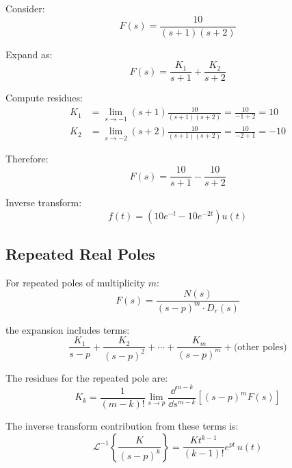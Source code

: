 \begin{examplebox}[title=Example: Distinct Real Poles]

Consider:
\begin{equation*}
    F(s) = \frac{10}{(s+1)(s+2)}
\end{equation*}

Expand as:
\begin{equation*}
    F(s) = \frac{K_1}{s+1} + \frac{K_2}{s+2}
\end{equation*}

Compute residues:
\begin{align*}
    K_1 &= \lim_{s \to -1} (s+1) \frac{10}{(s+1)(s+2)} = \frac{10}{-1+2} = 10 \\
    K_2 &= \lim_{s \to -2} (s+2) \frac{10}{(s+1)(s+2)} = \frac{10}{-2+1} = -10
\end{align*}

Therefore:
\begin{equation*}
    F(s) = \frac{10}{s+1} - \frac{10}{s+2}
\end{equation*}

Inverse transform:
\begin{equation*}
    f(t) = (10e^{-t} - 10e^{-2t}) u(t)
\end{equation*}

\end{examplebox}

\subsection{Repeated Real Poles}
\label{subsec:repeated_poles}

For repeated poles of multiplicity $m$:
\begin{equation}
    F(s) = \frac{N(s)}{(s-p)^m \cdot D_r(s)}
\end{equation}

the expansion includes terms:
\begin{equation}
    \frac{K_1}{s-p} + \frac{K_2}{(s-p)^2} + \cdots + \frac{K_m}{(s-p)^m} + \text{(other poles)}
\end{equation}

The residues for the repeated pole are:
\begin{equation}
    K_k = \frac{1}{(m-k)!} \lim_{s \to p} \frac{\dd^{m-k}}{\dd s^{m-k}} \left[ (s-p)^m F(s) \right]
\end{equation}

The inverse transform contribution from these terms is:
\begin{equation}
    \mathcal{L}^{-1}\left\{\frac{K}{(s-p)^k}\right\} = \frac{K t^{k-1}}{(k-1)!} e^{pt} \, u(t)
\end{equation}

